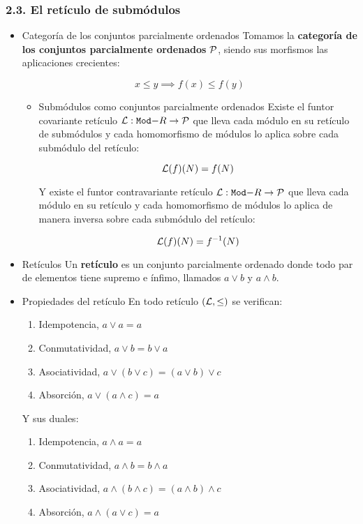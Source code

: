 \documentclass[11pt]{article}
\begin{document}
\subsubsection*{2.3. El retículo de submódulos}
\label{sec-7-2-3}
\begin{itemize}
\item Categoría de los conjuntos parcialmente ordenados
\label{sec-7-2-3-1}
Tomamos la \textbf{categoría de los conjuntos parcialmente ordenados} ${\cal P}$, siendo 
sus morfismos las aplicaciones crecientes:

\[
x \leq y \implies f(x) \leq f(y)
\]

\begin{itemize}
\item Submódulos como conjuntos parcialmente ordenados
\label{sec-7-2-3-1-1}
Existe el funtor covariante retículo ${\cal L} : \mathtt{Mod-}R \to {\cal P}$ que lleva cada módulo 
en su retículo de submódulos y cada homomorfismo de módulos lo aplica sobre
cada submódulo del retículo:

\[
{\cal L}(f)(N) = f(N)
\]

Y existe el funtor contravariante retículo ${\cal L} : \mathtt{Mod-}R \to {\cal P}$ que lleva cada
módulo en su retículo y cada homomorfismo de módulos lo aplica de manera
inversa sobre cada submódulo del retículo:

\[
{\cal L}(f)(N) = f^{-1}(N)
\]
\end{itemize}

\item Retículos
\label{sec-7-2-3-2}
Un \textbf{retículo} es un conjunto parcialmente ordenado donde todo par de
elementos tiene supremo e ínfimo, llamados $a \vee b$ y $a \wedge b$.

\item Propiedades del retículo
\label{sec-7-2-3-3}
En todo retículo $({\cal L}, \leq)$ se verifican:

\begin{enumerate}
\item Idempotencia, $a \vee a = a$
\item Conmutatividad, $a \vee b = b \vee a$
\item Asociatividad, $a \vee (b \vee c) = (a \vee b) \vee c$
\item Absorción, $a \vee (a \wedge c) = a$
\end{enumerate}

Y sus duales:

\begin{enumerate}
\item Idempotencia, $a \wedge a = a$
\item Conmutatividad, $a \wedge b = b \wedge a$
\item Asociatividad, $a \wedge (b \wedge c) = (a \wedge b) \wedge c$
\item Absorción, $a \wedge (a \vee c) = a$
\end{enumerate}


\end{itemize}
\end{document}

